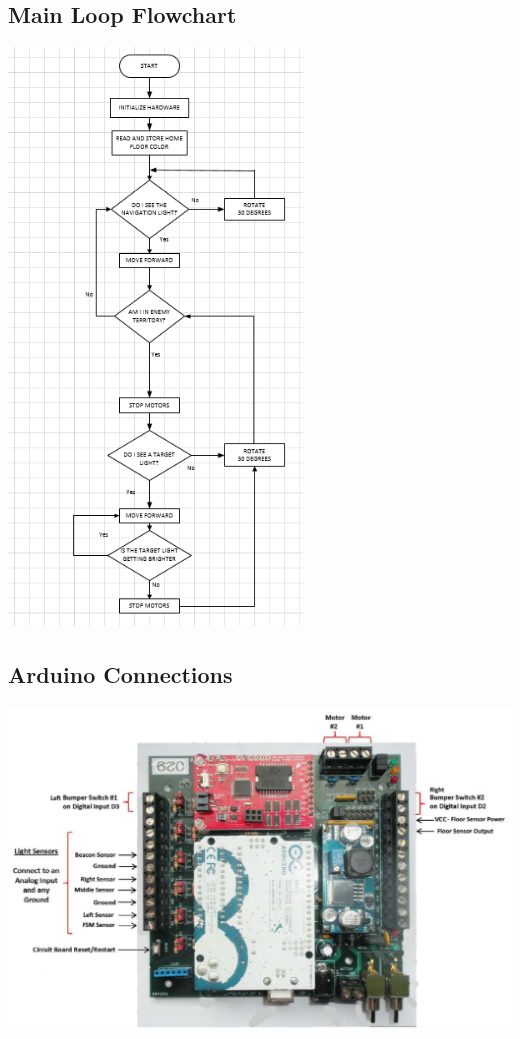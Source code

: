 \documentclass{article}
\begin{document}
\subsection{Main Loop Flowchart}
\begin{center}
\includegraphics[height=\textheight]{MainFlowchart.png}
\end{center}
\subsection{Arduino Connections}
\includegraphics[width=\textwidth]{IOConnections.png}
\end{document}
